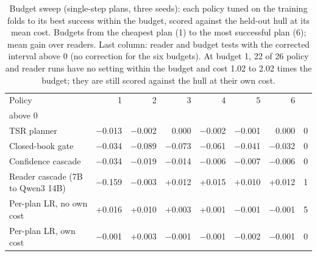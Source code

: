 \begin{table}[t]
\centering\small
\setlength{\tabcolsep}{4pt}
\caption{Budget sweep (single-step plans, three seeds): each policy tuned on the training folds to its best success within the budget, scored against the held-out hull at its mean cost. Budgets from the cheapest plan (1) to the most successful plan (6); mean gain over readers. Last column: reader and budget tests with the corrected interval above 0 (no correction for the six budgets). At budget 1, 22 of 26 policy and reader runs have no setting within the budget and cost 1.02 to 2.02 times the budget; they are still scored against the hull at their own cost.}
\label{tab:extra_sweep}
\begin{tabular*}{\linewidth}{@{\extracolsep{\fill}}lrrrrrrr}
\toprule
Policy & 1 & 2 & 3 & 4 & 5 & 6 & \begin{tabular}[b]{@{}r@{}}Intervals \\ above 0\end{tabular} \\
\midrule
TSR planner & $-$0.013 & $-$0.002 & 0.000 & $-$0.002 & $-$0.001 & 0.000 & 0 \\
Closed-book gate & $-$0.034 & $-$0.089 & $-$0.073 & $-$0.061 & $-$0.041 & $-$0.032 & 0 \\
Confidence cascade & $-$0.034 & $-$0.019 & $-$0.014 & $-$0.006 & $-$0.007 & $-$0.006 & 0 \\
Reader cascade (7B to Qwen3 14B) & $-$0.159 & $-$0.003 & +0.012 & +0.015 & +0.010 & +0.012 & 1 \\
Per-plan LR, no own cost & +0.016 & +0.010 & +0.003 & +0.001 & $-$0.001 & $-$0.001 & 5 \\
Per-plan LR, own cost & $-$0.001 & +0.003 & $-$0.001 & $-$0.001 & $-$0.002 & $-$0.001 & 0 \\
\bottomrule
\end{tabular*}
\end{table}
